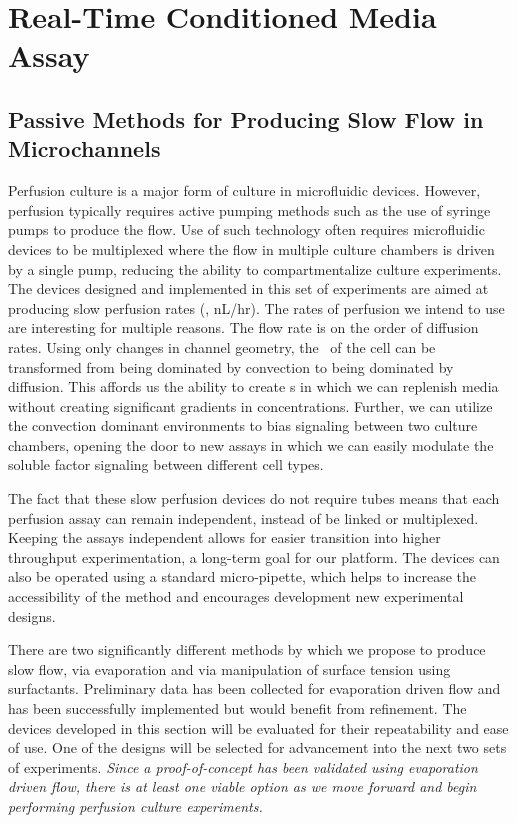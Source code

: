 \chapter{Real-Time Conditioned Media Assay}
\label{App:RealTimeCM}

\section{Passive Methods for Producing Slow Flow in Microchannels} \label{chap:slowFlow}

Perfusion culture is a major form of culture in microfluidic devices. However, perfusion typically requires active pumping methods such as the use of syringe pumps to produce the flow. Use of such technology often requires microfluidic devices to be multiplexed where the flow in multiple culture chambers is driven by a single pump, reducing the ability to compartmentalize culture experiments. The devices designed and implemented in this set of experiments are aimed at producing slow perfusion rates (\ie , nL/hr). The rates of perfusion we intend to use are interesting for multiple reasons. The flow rate is on the order of diffusion rates. Using only changes in channel geometry, the \me\ of the cell can be transformed from being dominated by convection to being dominated by diffusion. This affords us the ability to create \me s in which we can replenish media without creating significant gradients in concentrations. Further, we can utilize the convection dominant environments to bias signaling between two culture chambers, opening the door to new assays in which we can easily modulate the soluble factor signaling between different cell types.

The fact that these slow perfusion devices do not require tubes means that each perfusion assay can remain independent, instead of be linked or multiplexed. Keeping the assays independent allows for easier transition into higher throughput experimentation, a long-term goal for our platform. The devices can also be operated using a standard micro-pipette, which helps to increase the accessibility of the method and encourages development new experimental designs.

There are two significantly different methods by which we propose to produce slow flow, via evaporation and via manipulation of surface tension using surfactants. Preliminary data has been collected for evaporation driven flow and has been successfully implemented but would benefit from refinement. The devices developed in this section will be evaluated for their repeatability and ease of use. One of the designs will be selected for advancement into the next two sets of experiments. \emph{Since a proof-of-concept has been validated using evaporation driven flow, there is at least one viable option as we move forward and begin performing perfusion culture experiments.}

